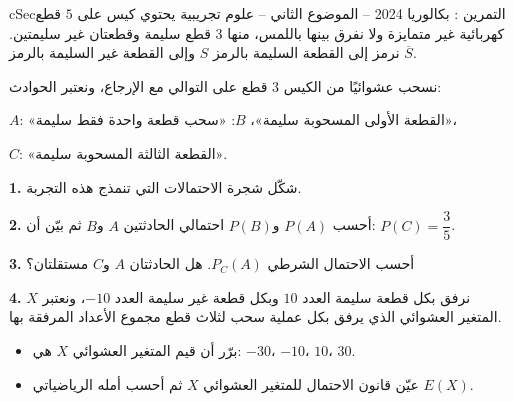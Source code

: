 \documentclass[12pt,a4paper]{article}
\newenvironment{BOX}[2]{\begin{otherlanguage}{english}\begin{arbox}{#1}{#2}}{\end{arbox}\end{otherlanguage}}
\newcounter{exo}
\newenvironment{tamrin}[1]{\stepcounter{exo}\begin{BOX}{cSec}{التمرين \theexo: #1}}{\end{BOX}}
\newenvironment{sq}{\begin{itemize}[leftmargin=2.4em,itemsep=3pt]}{\end{itemize}}
\newcommand{\qa}{\item[(أ)]}\newcommand{\qb}{\item[(ب)]}\newcommand{\qc}{\item[(جـ)]}\newcommand{\qd}{\item[(د)]}\newcommand{\qe}{\item[(هـ)]}
\newcommand{\QQ}[1]{\par\smallskip\textbf{#1.} }
\begin{document}
\begin{tamrin}{بكالوريا 2024 -- الموضوع الثاني -- علوم تجريبية}
يحتوي كيس على $5$ قطع كهربائية غير متمايزة ولا نفرق بينها باللمس، منها $3$ قطع سليمة وقطعتان غير سليمتين.
نرمز إلى القطعة السليمة بالرمز $S$ وإلى القطعة غير السليمة بالرمز $\overline{S}$.

نسحب عشوائيًا من الكيس $3$ قطع على التوالي مع الإرجاع، ونعتبر الحوادث:

$A$: «القطعة الأولى المسحوبة سليمة»، \quad $B$: «سحب قطعة واحدة فقط سليمة»،

$C$: «القطعة الثالثة المسحوبة سليمة».
\QQ{1} شكّل شجرة الاحتمالات التي تنمذج هذه التجربة.
\QQ{2} أحسب $P(A)$ و$P(B)$ احتمالي الحادثتين $A$ و$B$ ثم بيّن أن: $P(C)=\dfrac35$.
\QQ{3} أحسب الاحتمال الشرطي $P_C(A)$. هل الحادثتان $A$ و$C$ مستقلتان؟
\QQ{4} نرفق بكل قطعة سليمة العدد $10$ وبكل قطعة غير سليمة العدد $-10$، ونعتبر $X$ المتغير العشوائي الذي يرفق بكل عملية سحب لثلاث قطع مجموع الأعداد المرفقة بها.
\begin{sq}
\qa برّر أن قيم المتغير العشوائي $X$ هي: $-30$، $-10$، $10$، $30$.
\qb عيّن قانون الاحتمال للمتغير العشوائي $X$ ثم أحسب أمله الرياضياتي $E(X)$.
\end{sq}
\end{tamrin}
\end{document}
